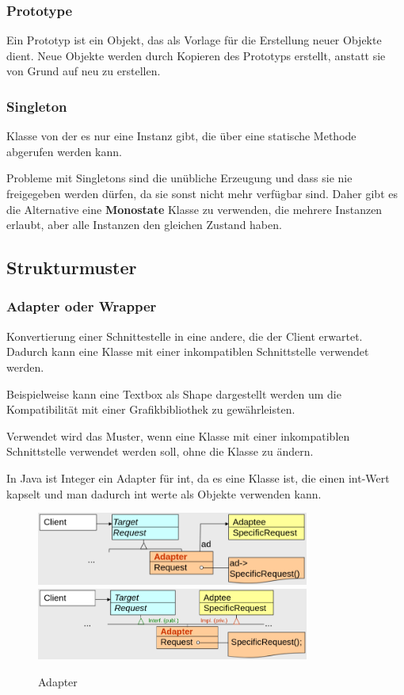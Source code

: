 \documentclass[12pt]{scrartcl}
\begin{document}
\subsubsection{Prototype}

Ein Prototyp ist ein Objekt, das als Vorlage für die Erstellung neuer Objekte dient. Neue Objekte werden durch Kopieren des Prototyps erstellt,
anstatt sie von Grund auf neu zu erstellen.

\subsubsection{Singleton}

Klasse von der es nur eine Instanz gibt, die über eine statische Methode abgerufen werden kann.

Probleme mit Singletons sind die unübliche Erzeugung und dass sie nie freigegeben werden dürfen, da sie sonst nicht mehr verfügbar sind. Daher gibt
es die Alternative eine \textbf{Monostate} Klasse zu verwenden, die mehrere Instanzen erlaubt, aber alle Instanzen den gleichen Zustand haben.

\subsection{Strukturmuster}

\subsubsection{Adapter oder Wrapper}

Konvertierung einer Schnittestelle in eine andere, die der Client erwartet. Dadurch kann eine Klasse mit einer inkompatiblen Schnittstelle verwendet werden.

Beispielweise kann eine Textbox als Shape dargestellt werden um die Kompatibilität mit einer Grafikbibliothek zu gewährleisten.

Verwendet wird das Muster, wenn eine Klasse mit einer inkompatiblen Schnittstelle verwendet werden soll, ohne die Klasse zu ändern.

In Java ist Integer ein Adapter für int, da es eine Klasse ist, die einen int-Wert kapselt und man dadurch int werte als Objekte verwenden kann.

\begin{figure}[H]
	\centering
	\includegraphics[width=0.8\textwidth]{images/muster_4.png}
	\includegraphics[width=0.8\textwidth]{images/muster_5.png}
	\caption{Adapter}
\end{figure}
\end{document}
